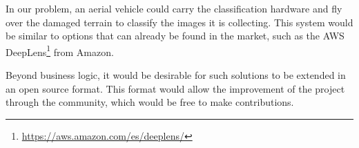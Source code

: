 In our problem, an aerial vehicle could carry the classification hardware and fly over the damaged terrain to classify the images it is collecting.
This system would be similar to options that can already be found in the market, such as the AWS DeepLens\footnote{\url{https://aws.amazon.com/es/deeplens/}} from Amazon.

Beyond business logic, it would be desirable for such solutions to be extended in an open source format. This format would allow the improvement of the project through the community, which would be free to make contributions.
